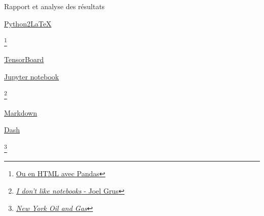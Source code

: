 \documentclass[aspectratio=169,10pt,xcolor=x11names,english,french]{beamer}
\begin{document}
	\begin{frame}{Rapport et analyse des résultats}
		\begin{minipage}{0.18\linewidth}
			\centering
			\fontsize{35}{35}\faGithub\vfill
			\vspace{3em}
			\normalsize\href{https://github.com/jsleb333/python2latex}{Python2LaTeX}
		\end{minipage}\footnote{\href{https://pythonexamples.org/pandas-render-dataframe-as-html-table/}{Ou en HTML avec Pandas}}
		\begin{minipage}{0.18\linewidth}
			\centering
			 \vfil
			\vspace{1.5em}
			\href{https://www.tensorflow.org/tensorboard?hl=fr}{TensorBoard}
		\end{minipage}
		\begin{minipage}{0.18\linewidth}
			\centering
			 \vfil
			\vspace{1.5em}
			\href{https://jupyter.org/}{Jupyter notebook}
		\end{minipage}\footnote{\href{https://www.youtube.com/watch?v=7jiPeIFXb6U}{\textit{I don't like notebooks} - Joel Grus}}
		\begin{minipage}{0.18\linewidth}
			\centering
			 \vfil
			\vspace{2.6em}
			\href{https://fr.wikipedia.org/wiki/Markdown}{Markdown}
		\end{minipage}
		\begin{minipage}{0.18\linewidth}
			\centering
			 \vfil
			\vspace{3.5em}
			\href{https://dash.plotly.com/}{Dash}
		\end{minipage}\footnote{\href{https://dash-gallery.plotly.host/dash-oil-and-gas/}{\textit{New York Oil and Gas}}}
		\note{}
	\end{frame}
\end{document}
